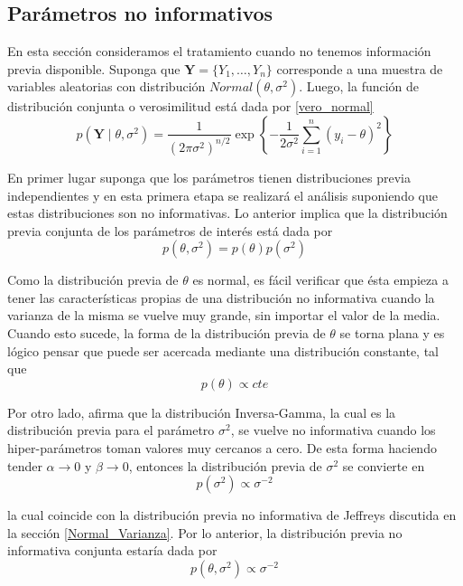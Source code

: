 \documentclass[10pt,openright]{book}\usepackage[]{graphicx}\usepackage[]{color}
\begin{document}
\subsection{Par\'ametros no informativos}
En esta secci\'on consideramos el tratamiento cuando no tenemos informaci\'on previa disponible. Suponga que $\mathbf{Y}=\{Y_1,\ldots,Y_n\}$ corresponde a una muestra de variables aleatorias con distribuci\'on $Normal(\theta,\sigma^2)$. Luego, la funci\'on de distribuci\'on conjunta o verosimilitud est\'a dada por \ref{vero_normal}
\begin{equation*}
p(\mathbf{Y} \mid \theta, \sigma^2)=\frac{1}{(2\pi\sigma^2)^{n/2}}\exp\left\{-\frac{1}{2\sigma^2}\sum_{i=1}^n(y_i-\theta)^2\right\}
\end{equation*}

En primer lugar suponga que los par\'ametros tienen distribuciones previa independientes y en esta primera etapa se realizar\'a el an\'alisis suponiendo que estas distribuciones son no informativas. Lo anterior implica que la distribuci\'on previa conjunta de los par\'ametros de inter\'es est\'a dada por
\begin{equation}
p(\theta,\sigma^2)=p(\theta)p(\sigma^2)
\end{equation}

Como la distribuci\'on previa de $\theta$ es normal, es f\'acil verificar que \'esta empieza a tener las caracter\'isticas propias de una distribuci\'on no informativa cuando la varianza de la misma se vuelve muy grande, sin importar el valor de la media. Cuando esto sucede, la forma de la distribuci\'on previa de $\theta$ se torna plana y es l\'ogico pensar que puede ser acercada mediante una distribuci\'on constante, tal que
\begin{equation*}
p(\theta)\propto cte
\end{equation*}

Por otro lado,  afirma que la distribuci\'on Inversa-Gamma, la cual es la distribuci\'on previa para el par\'ametro $\sigma^2$, se vuelve no informativa cuando los hiper-par\'ametros toman valores muy cercanos a cero. De esta forma haciendo tender $\alpha \longrightarrow 0$ y $\beta \longrightarrow 0$, entonces la distribuci\'on previa de $\sigma^2$ se convierte en
\begin{equation*}
p(\sigma^2)\propto \sigma^{-2}
\end{equation*}

la cual coincide con la distribuci\'on previa no informativa de Jeffreys discutida en la secci\'on \ref{Normal_Varianza}. Por lo anterior, la distribuci\'on previa no informativa conjunta estar\'ia dada por
\begin{equation}\label{previa_noinfo_conjunta}
p(\theta,\sigma^2)\propto \sigma^{-2}
\end{equation}
\end{document}
